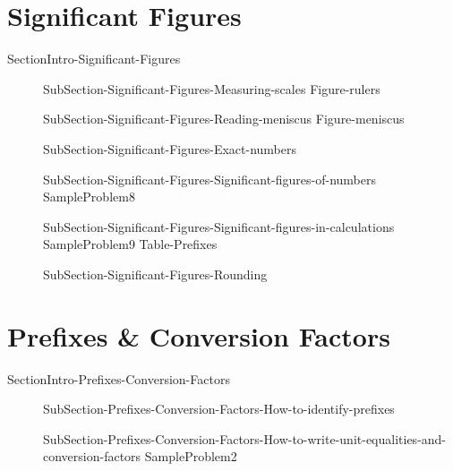 \documentclass[main.tex]{subfiles}
\begin{document}
\section{Significant Figures}{SectionIntro-Significant-Figures}
\sloppy\begin{description}
\item[]{SubSection-Significant-Figures-Measuring-scales}
{Figure-rulers}
\item[]{SubSection-Significant-Figures-Reading-meniscus}
{Figure-meniscus}
\item[]{SubSection-Significant-Figures-Exact-numbers}
\item[]{SubSection-Significant-Figures-Significant-figures-of-numbers}
{SampleProblem8}%
\item[]{SubSection-Significant-Figures-Significant-figures-in-calculations}
{SampleProblem9}%
{Table-Prefixes}
\item[]{SubSection-Significant-Figures-Rounding}
\end{description}

\section{Prefixes \& Conversion Factors}{SectionIntro-Prefixes-Conversion-Factors}
\sloppy\begin{description}
\item[]{SubSection-Prefixes-Conversion-Factors-How-to-identify-prefixes}
\item[]{SubSection-Prefixes-Conversion-Factors-How-to-write-unit-equalities-and-conversion-factors}
{SampleProblem2}%
\end{description}
\end{document}
